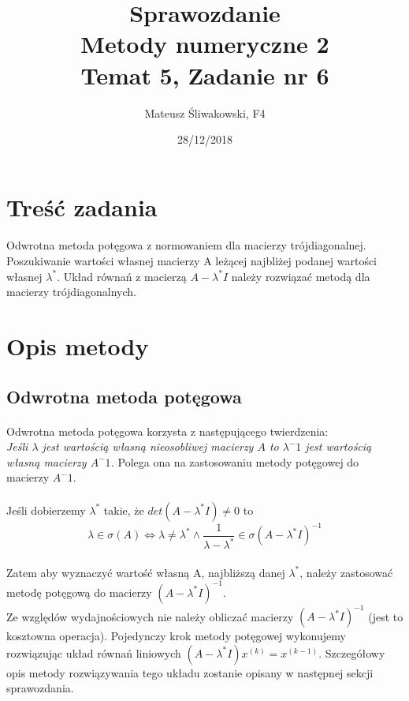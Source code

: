 \documentclass{article}
\title{Sprawozdanie \\Metody numeryczne 2 \\\textbf{Temat 5, Zadanie nr 6}}
\date{28/12/2018}
\author{Mateusz Śliwakowski, F4}
\begin{document}
  \maketitle
 	  \newpage

\section{Treść zadania}
\paragraph{}
Odwrotna metoda potęgowa z normowaniem dla macierzy trójdiagonalnej. Poszukiwanie wartości własnej macierzy A leżącej najbliżej podanej wartości własnej $\lambda^*$. Układ równań z macierzą $A - \lambda^*I$ należy rozwiązać metodą dla macierzy trójdiagonalnych.
\section{Opis metody}
\subsection{Odwrotna metoda potęgowa}
\paragraph{}
Odwrotna metoda potęgowa korzysta z następującego twierdzenia:\\
\textit{Jeśli $\lambda$ jest wartością własną nieosobliwej macierzy $A$ to $\lambda^-1$ jest wartością własną macierzy $A^-1$.}
Polega ona na zastosowaniu metody potęgowej do macierzy $A^-1$.
\paragraph{}
Jeśli dobierzemy $\lambda^*$ takie, że $det(A-\lambda^{*}I)\neq0$ to $$\lambda \in \sigma(A) \Leftrightarrow \lambda \neq \lambda^{*} \wedge \frac{1}{\lambda-\lambda^{*}} \in \sigma(A-\lambda^* I)^{-1}$$ 
\paragraph{}
Zatem aby wyznaczyć wartość własną A, najbliższą danej $\lambda^*$, należy zastosować metodę potęgową do macierzy $(A-\lambda^*I)^{-1}$.\\
Ze względów wydajnościowych nie należy obliczać macierzy $(A-\lambda^*I)^{-1}$ (jest to kosztowna operacja). Pojedynczy krok metody potęgowej wykonujemy rozwiązując układ równań liniowych $(A - \lambda^*I)x^{(k)} = x^{(k-1)}$. Szczegółowy opis metody rozwiązywania tego układu zostanie opisany w następnej sekcji sprawozdania.
\end{document}
